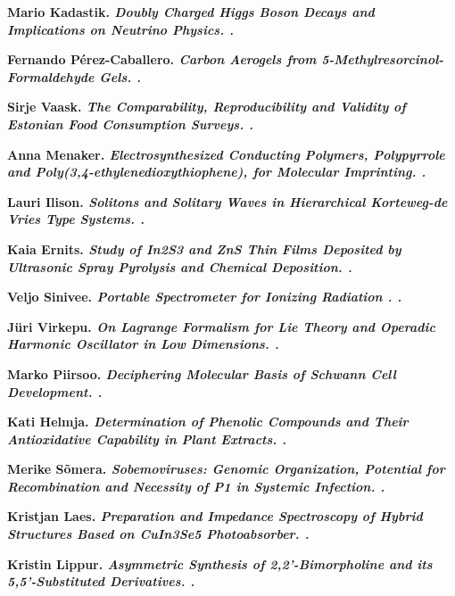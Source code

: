 \begin{list}
\item \bf Mario Kadastik. \it Doubly Charged Higgs Boson Decays and
  Implications on Neutrino Physics. .

\item \bf Fernando P\'erez-Caballero. \it Carbon Aerogels from
  5-Methylresorcinol-Formaldehyde Gels. .

\item \bf Sirje Vaask. \it The Comparability, Reproducibility and Validity of
  Estonian Food Consumption Surveys. .

\item \bf Anna Menaker. \it Electrosynthesized Conducting Polymers,
  Polypyrrole and Poly(3,4-ethylenedioxythiophene), for Molecular
  Imprinting. .

\item \bf Lauri Ilison. \it Solitons and Solitary Waves in Hierarchical
  Korteweg-de Vries Type Systems. .

\item \bf Kaia Ernits. \it Study of In2S3 and ZnS Thin Films Deposited by
  Ultrasonic Spray Pyrolysis and Chemical Deposition. .

\item \bf Veljo Sinivee. \it Portable Spectrometer for Ionizing Radiation
  . .

\item \bf J\"uri Virkepu. \it On Lagrange Formalism for Lie Theory and
  Operadic Harmonic Oscillator in Low Dimensions. .

\item \bf Marko Piirsoo. \it Deciphering Molecular Basis of Schwann Cell
  Development. .

\item \bf Kati Helmja. \it Determination of Phenolic Compounds and Their
  Antioxidative Capability in Plant Extracts. .

\item \bf Merike S\~omera. \it Sobemoviruses: Genomic Organization, Potential
  for Recombination and Necessity of P1 in Systemic Infection. .

\item \bf Kristjan Laes. \it Preparation and Impedance Spectroscopy of Hybrid
  Structures Based on CuIn3Se5 Photoabsorber. .

\item \bf Kristin Lippur. \it Asymmetric Synthesis of 2,2’-Bimorpholine and
  its 5,5’-Substituted Derivatives. .


\end{list}
